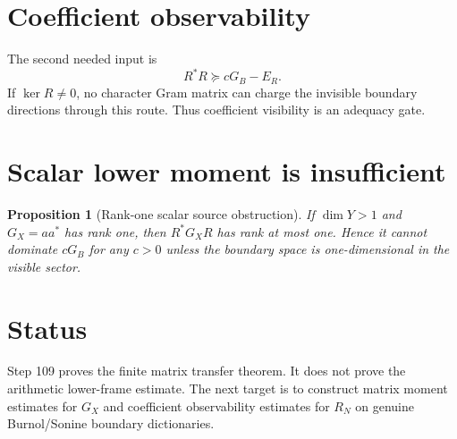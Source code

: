 \documentclass[11pt]{article}
\newtheorem{proposition}{Proposition}
\begin{document}
\section{Coefficient observability}
The second needed input is
\[
R^*R\succeq cG_B-E_R.
\]
If $\ker R\neq0$, no character Gram matrix can charge the invisible boundary directions through this route. Thus coefficient visibility is an adequacy gate.

\section{Scalar lower moment is insufficient}
\begin{proposition}[Rank-one scalar source obstruction]
If $\dim Y>1$ and $G_X=aa^*$ has rank one, then $R^*G_XR$ has rank at most one. Hence it cannot dominate $cG_B$ for any $c>0$ unless the boundary space is one-dimensional in the visible sector.
\end{proposition}

\section{Status}
Step 109 proves the finite matrix transfer theorem. It does not prove the arithmetic lower-frame estimate. The next target is to construct matrix moment estimates for $G_X$ and coefficient observability estimates for $R_N$ on genuine Burnol/Sonine boundary dictionaries.
\end{document}
